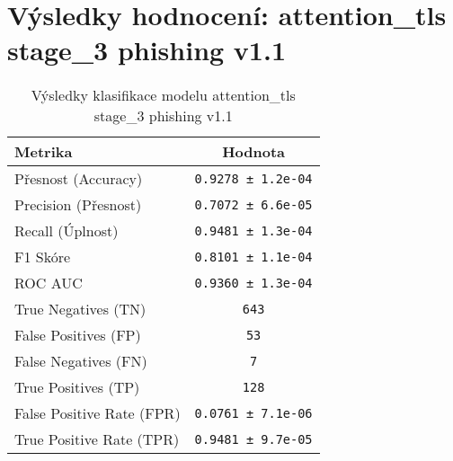 \section*{Výsledky hodnocení: attention_tls stage_3 phishing v1.1}
\begin{table}[h!]
\centering
\begin{tabular}{|l|c|}
\hline
\textbf{Metrika} & \textbf{Hodnota} \\
\hline
Přesnost (Accuracy) & \texttt{0.9278 ± 1.2e-04} \\
Precision (Přesnost) & \texttt{0.7072 ± 6.6e-05} \\
Recall (Úplnost) & \texttt{0.9481 ± 1.3e-04} \\
F1 Skóre & \texttt{0.8101 ± 1.1e-04} \\
ROC AUC & \texttt{0.9360 ± 1.3e-04} \\
True Negatives (TN) & \texttt{643} \\
False Positives (FP) & \texttt{53} \\
False Negatives (FN) & \texttt{7} \\
True Positives (TP) & \texttt{128} \\
False Positive Rate (FPR) & \texttt{0.0761 ± 7.1e-06} \\
True Positive Rate (TPR) & \texttt{0.9481 ± 9.7e-05} \\
\hline
\end{tabular}
\caption{Výsledky klasifikace modelu attention_tls stage_3 phishing v1.1}
\label{tab:phishing_attention_tls}
\end{table}

